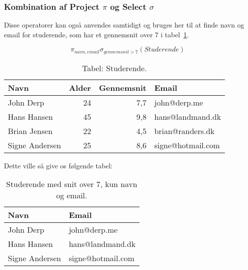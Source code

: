 \subsubsection{Kombination af Project $\pi$ og Select $\sigma$}

Disse operatorer kan også anvendes samtidigt og bruges her til at finde navn og email for studerende, som har et gennemsnit over 7 i tabel~\ref{tab:stud}.

\begin{equation}
\pi_{navn, email}\sigma_{gennemsnit>7}(Studerende)
\end{equation}

\begin{table}[H]
	\begin{tabular}{lrrl}
		\toprule
		\textbf{Navn}	&\textbf{Alder}	&\textbf{Gennemsnit}&\textbf{Email}\\
		\midrule
		John Derp		& 24 			& 7,7	& john@derp.me			\\			
		Hans Hansen		& 45 			& 9,8	& hans@landmand.dk		\\			
		Brian Jensen	& 22 			& 4,5	& brian@randers.dk		\\			
		Signe Andersen	& 25 			& 8,6	& signe@hotmail.com		\\
		\bottomrule
	\end{tabular}
	\caption{Tabel: Studerende.}
	\label{tab:stud}
\end{table}

Dette ville så give os følgende tabel:

\begin{table}[H]
	\begin{tabular}{ll}
		\toprule
		\textbf{Navn}	& \textbf{Email}	\\
		\midrule
		John Derp		& john@derp.me		\\			
		Hans Hansen		& hans@landmand.dk	\\			
		Signe Andersen	& signe@hotmail.com	\\
		\bottomrule
	\end{tabular}
	\caption{Studerende med snit over 7, kun navn og email.}
\end{table}